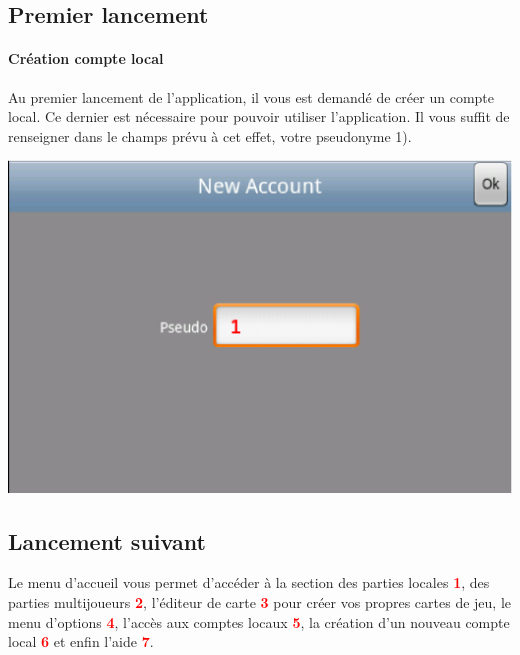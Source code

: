 \subsection{Premier lancement}
	
		
	\paragraph{Création compte local\\}
	Au premier lancement de l'application, il vous est demandé de créer un compte 
	local. Ce dernier est nécessaire pour pouvoir utiliser l'application. Il vous
	suffit de renseigner dans le champs prévu à cet effet, votre pseudonyme 1).
	\begin{center}
			\includegraphics[scale=0.6]{Manuel/Img/2.eps}
	\end{center}


\subsection{Lancement suivant}
	Le menu d'accueil vous permet d'accéder à la section des parties locales
	\textcolor{red}{\textbf{1}}, des parties multijoueurs
	\textcolor{red}{\textbf{2}}, l'éditeur de carte \textcolor{red}{\textbf{3}}
	pour créer vos propres cartes de jeu, le menu d'options
	\textcolor{red}{\textbf{4}}, l'accès aux comptes locaux
	\textcolor{red}{\textbf{5}}, la création d'un nouveau compte local
	\textcolor{red}{\textbf{6}} et enfin l'aide \textcolor{red}{\textbf{7}}.
	

